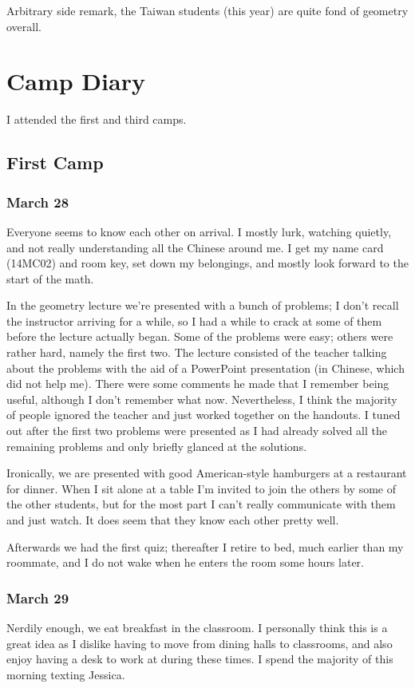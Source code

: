 \documentclass[11pt]{scrreprt}
\begin{document}
Arbitrary side remark, the Taiwan students (this year) are quite fond of geometry overall.


\chapter{Camp Diary}
I attended the first and third camps.

\section{First Camp}
\subsection{March 28}
Everyone seems to know each other on arrival.
I mostly lurk, watching quietly, and not really understanding all the Chinese around me.
I get my name card (14MC02) and room key, set down my belongings,
and mostly look forward to the start of the math.

In the geometry lecture we're presented with a bunch of problems;
I don't recall the instructor arriving for a while,
so I had a while to crack at some of them before the lecture actually began.
Some of the problems were easy; others were rather hard, namely the first two.
The lecture consisted of the teacher talking about the problems with the aid of
a PowerPoint presentation (in Chinese, which did not help me).
There were some comments he made that I remember being useful, although I don't remember what now.
Nevertheless, I think the majority of people ignored the teacher and just worked together on the handouts.
I tuned out after the first two problems were presented as I had already solved
all the remaining problems and only briefly glanced at the solutions.

Ironically, we are presented with good American-style hamburgers at a restaurant for dinner.
When I sit alone at a table I'm invited to join the others by some of the other students,
but for the most part I can't really communicate with them and just watch.
It does seem that they know each other pretty well.

Afterwards we had the first quiz; thereafter I retire to bed, much earlier than my roommate,
and I do not wake when he enters the room some hours later.

\subsection{March 29}
Nerdily enough, we eat breakfast in the classroom.
I personally think this is a great idea as I dislike having to move from dining halls to classrooms,
and also enjoy having a desk to work at during these times.
I spend the majority of this morning texting Jessica.
\end{document}
